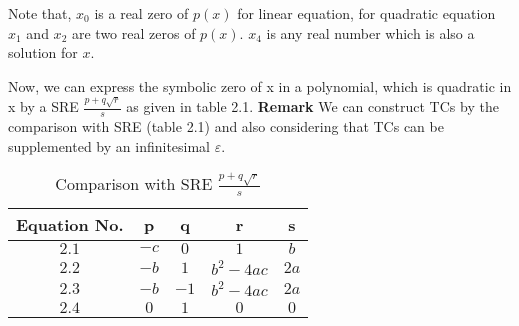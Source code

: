 Note that, $x_{0}$ is a real zero of $p(x)$ for linear equation, for quadratic equation $x_{1}$ and $x_{2}$ are two real zeros of $p(x)$. $x_{4}$ is any real number which is also a solution for $x$.


Now, we can express the symbolic zero of x in a polynomial, which is quadratic in x by a SRE $\frac{p+q\sqrt{r}}{s}$ as given in table 2.1.\newline
\textbf{Remark} We can construct TCs by the comparison with SRE (table 2.1) and also considering that TCs can be supplemented by an infinitesimal $\varepsilon$.

\begin{table}[htb]
	\caption{Comparison with SRE $\frac{p+q\sqrt{r}}{s}$}
	\label{tab:nameOfTheTable}
	\bigskip %
	\begin{center}
		\begin{tabular}{|c|c|c|c|c|}
			\hline
			Equation No.& p & q & r & s \\
			\hline \hline
			$2.1$ & $-c$ & $0$ & $1$ & $b$ \\
			\hline
			$2.2$ & $-b$ & $1$ & $b^{2}-4ac$ & $2a$ \\
			\hline
			$2.3$ & $-b$ & $-1$ & $b^{2}-4ac$ & $2a$ \\
			\hline
			$2.4$ & $0$ & $1$ & $0$ & $0$ \\
			\hline
		\end{tabular}
	\end{center}
\end{table}


